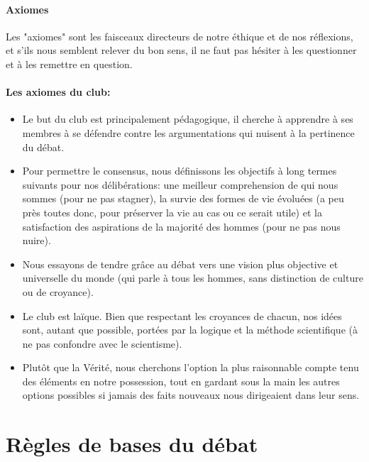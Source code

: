 \documentclass[a4paper,11pt]{article}
\begin{document}
\paragraph{Axiomes}
Les "axiomes" sont les faisceaux directeurs de notre éthique et de nos réflexions, et s'ils nous semblent relever du bon sens, il ne faut pas hésiter à les questionner et à les remettre en question.

\paragraph{Les axiomes du club:}
\begin{itemize}
 \item  Le but du club est principalement pédagogique, il cherche à apprendre à ses membres à se défendre contre les argumentations qui nuisent à la pertinence du débat.
 \item  Pour permettre le consensus, nous définissons les objectifs à long termes suivants pour nos délibérations: une meilleur comprehension de qui nous sommes (pour ne pas stagner), la survie des formes de vie évoluées (a peu près toutes donc, pour préserver la vie au cas ou ce serait utile) et la satisfaction des aspirations de la majorité des hommes (pour ne pas nous nuire).
 \item  Nous essayons de tendre grâce au débat vers une vision plus objective et universelle du monde (qui parle à tous les hommes, sans distinction de culture ou de croyance).
 \item  Le club est laïque. Bien que respectant les croyances de chacun, nos idées sont, autant que possible, portées par la logique et la méthode scientifique (à ne pas confondre avec le scientisme).
 \item  Plutôt que la Vérité, nous cherchons l'option la plus raisonnable compte tenu des éléments en notre possession, tout en gardant sous la main les autres options possibles si jamais des faits nouveaux nous dirigeaient dans leur sens.
\end{itemize}

\section{Règles de bases du débat}
\end{document}
